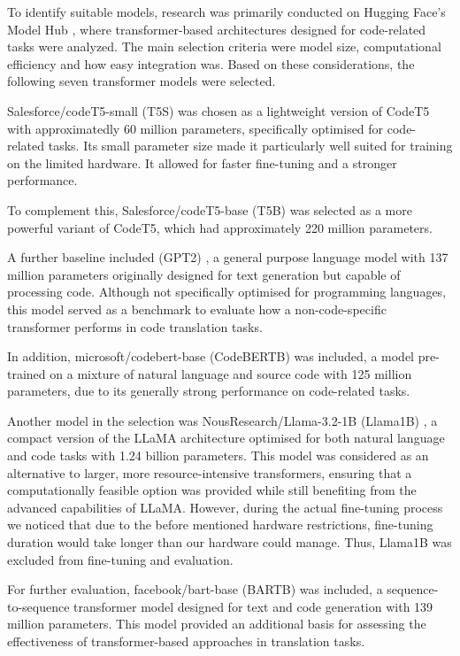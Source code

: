 \documentclass[conference]{IEEEtran}
\begin{document}
To identify suitable models, research was primarily conducted on Hugging Face's Model Hub \cite{b2}, where transformer-based architectures designed for code-related tasks were analyzed. The main selection criteria were model size, computational efficiency and how easy integration was. Based on these considerations, the following seven transformer models were selected.

Salesforce/codeT5-small (T5S) \cite{b3} was chosen as a lightweight version of CodeT5 with approximatedly 60 million parameters, specifically optimised for code-related tasks. Its small parameter size made it particularly well suited for training on the limited hardware. It allowed for faster fine-tuning and a stronger performance.

To complement this, Salesforce/codeT5-base (T5B) \cite{b4} was selected as a more powerful variant of CodeT5, which had approximately 220 million parameters.

A further baseline included (GPT2) \cite{b5}, a general purpose language model with 137 million parameters originally designed for text generation but capable of processing code. Although not specifically optimised for programming languages, this model served as a benchmark to evaluate how a non-code-specific transformer performs in code translation tasks.

In addition, microsoft/codebert-base (CodeBERTB) \cite{b6} was included, a model pre-trained on a mixture of natural language and source code with 125 million parameters, due to its generally strong performance on code-related tasks.

Another model in the selection was NousResearch/Llama-3.2-1B (Llama1B) \cite{b7}, a compact version of the LLaMA architecture optimised for both natural language and code tasks with 1.24 billion parameters. This model was considered as an alternative to larger, more resource-intensive transformers, ensuring that a computationally feasible option was provided while still benefiting from the advanced capabilities of LLaMA. However, during the actual fine-tuning process we noticed that due to the before mentioned hardware restrictions, fine-tuning duration would take longer than our hardware could manage. Thus, Llama1B was excluded from fine-tuning and evaluation.  

For further evaluation, facebook/bart-base (BARTB) \cite{b8} was included, a sequence-to-sequence transformer model designed for text and code generation with 139 million parameters. This model provided an additional basis for assessing the effectiveness of transformer-based approaches in translation tasks.
\end{document}

